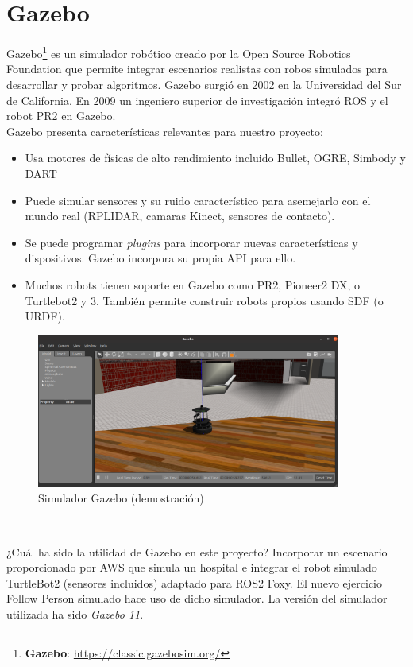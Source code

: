 \section{Gazebo}
\label{sec:gazebo}

Gazebo\footnote{\textbf{Gazebo}: \url{https://classic.gazebosim.org/}} es un simulador robótico creado por la Open Source Robotics Foundation que permite integrar escenarios realistas con robos simulados para desarrollar y probar algoritmos. Gazebo surgió en 2002 en la Universidad del Sur de California. En 2009 un ingeniero superior de investigación integró ROS y el robot PR2 en Gazebo.\\

Gazebo presenta características relevantes para nuestro proyecto:
\begin{itemize}
	\item Usa motores de físicas de alto rendimiento incluido Bullet, OGRE, Simbody y DART
	\item Puede simular sensores y su ruido característico para asemejarlo con el mundo real (RPLIDAR, camaras Kinect, sensores de contacto).
	\item Se puede programar \textit{plugins} para incorporar nuevas características y dispositivos. Gazebo incorpora su propia API para ello.
	\item Muchos robots tienen soporte en Gazebo como PR2, Pioneer2 DX,  o Turtlebot2 y 3. También permite construir robots propios usando SDF (o URDF).
\end{itemize}

\begin{figure} [H]
  \begin{center}
    \includegraphics[width=10cm]{imagenes/cap3/simulacion-gazebo.png}
  \end{center}
  \caption{Simulador Gazebo (demostración)}
  \label{fig:simulador_gazebo}
\end{figure}\

¿Cuál ha sido la utilidad de Gazebo en este proyecto? Incorporar un escenario proporcionado por AWS que simula un hospital e integrar el robot simulado TurtleBot2 (sensores incluidos) adaptado para ROS2 Foxy. El nuevo ejercicio Follow Person simulado hace uso de dicho simulador. La versión del simulador utilizada ha sido \textit{Gazebo 11}.\\




